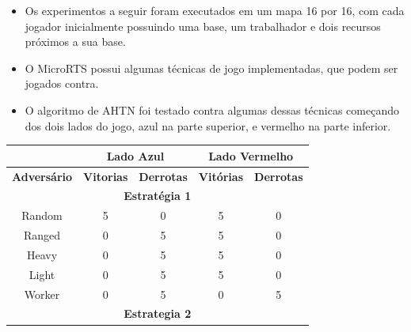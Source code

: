 \documentclass[a0,portrait]{a0poster}
\begin{document}
\begin{multicols}{2}
\begin{itemize}
	[leftmargin=2em]\itemadjust
	\item Os experimentos a seguir foram executados em um mapa 16 por 16, com cada jogador inicialmente possuindo uma base, um trabalhador e dois recursos pr\'oximos a sua base. 
	\item O MicroRTS possui algumas t\'ecnicas de jogo implementadas, que podem ser jogados contra.
	\item O algoritmo de AHTN foi testado contra algumas dessas t\'ecnicas começando dos dois lados do jogo, azul na parte superior, e vermelho na parte inferior.
\end{itemize}

\vspace{10mm}

{\small
\begin{center}
	\begin{tabular}{|c|cc|cc|}
		\hline
		\textbf{}           & \multicolumn{2}{c|}{\textbf{Lado Azul}}                    & \multicolumn{2}{c|}{\textbf{Lado Vermelho}}                \\ \hline
		\textbf{Advers\'ario} & \multicolumn{1}{c|}{\textbf{Vitorias}} & \textbf{Derrotas} & \multicolumn{1}{c|}{\textbf{Vit\'orias}} & \textbf{Derrotas} \\ \hline
		\multicolumn{5}{|c|}{\textbf{Estrat\'egia 1}}                                                                                                   \\ \hline
		Random              & 5                                      & 0                 & 5                                      & 0                 \\
		Ranged              & 0                                      & 5                 & 5                                      & 0                 \\
		Heavy               & 0                                      & 5                 & 5                                      & 0                 \\
		Light               & 0                                      & 5                 & 5                                      & 0                 \\
		Worker              & 0                                      & 5                 & 0                                      & 5                 \\ \hline
		\multicolumn{5}{|c|}{\textbf{Estrategia 2}}                                                                                                   \\ \hline

\end{tabular}
\end{center}}
\end{multicols}
\end{document}
